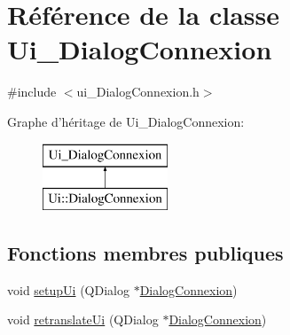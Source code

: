 \hypertarget{class_ui___dialog_connexion}{\section{Référence de la classe Ui\-\_\-\-Dialog\-Connexion}
\label{class_ui___dialog_connexion}
}


{\ttfamily \#include $<$ui\-\_\-\-Dialog\-Connexion.\-h$>$}

Graphe d'héritage de Ui\-\_\-\-Dialog\-Connexion\-:\begin{figure}[H]
\begin{center}
\leavevmode
\includegraphics[height=2.000000cm]{class_ui___dialog_connexion}
\end{center}
\end{figure}
\subsection*{Fonctions membres publiques}
\begin{DoxyCompactItemize}
\item 
void \hyperlink{class_ui___dialog_connexion_a6291dbf1c6dca03c2a9e70d87007b113}{setup\-Ui} (Q\-Dialog $\ast$\hyperlink{class_dialog_connexion}{Dialog\-Connexion})
\item 
void \hyperlink{class_ui___dialog_connexion_a3c9e6d3213c98a4c3d21bb365e87f79c}{retranslate\-Ui} (Q\-Dialog $\ast$\hyperlink{class_dialog_connexion}{Dialog\-Connexion})
\end{DoxyCompactItemize}
